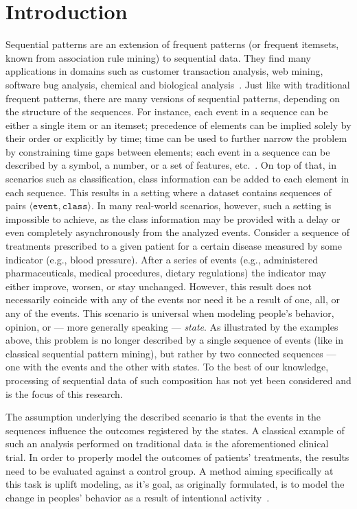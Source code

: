 \documentclass[runningheads,a4paper]{llncs}
\begin{document}
\section{Introduction}
\label{sec:introduction}

Sequential patterns are an extension of frequent patterns (or frequent itemsets, known from association rule mining) to sequential data.
They find many applications in domains such as customer transaction analysis, web mining, software bug analysis, chemical and biological analysis~\cite{Aggarwal:2014}.
Just like with traditional frequent patterns, there are many versions of sequential patterns, depending on the structure of the sequences.
For instance, each event in a sequence can be either a single item or an itemset; precedence of elements can be implied solely by their order or explicitly by time; time can be used to further narrow the problem by constraining time gaps between elements; each event in a sequence can be described by a symbol, a number, or a set of features, etc.~\cite{Dong:2009}.
On top of that, in scenarios such as classification, class information can be added to each element in each sequence.
This results in a setting where a dataset contains sequences of pairs $\langle\texttt{event}, \texttt{class}\rangle$.
In many real-world scenarios, however, such a setting is impossible to achieve, as the class information may be provided with a delay or even completely asynchronously from the analyzed events.
Consider a sequence of treatments prescribed to a given patient for a certain disease measured by some indicator (e.g., blood pressure).
After a series of events (e.g., administered pharmaceuticals, medical procedures, dietary regulations) the indicator may either improve, worsen, or stay unchanged.
However, this result does not necessarily coincide with any of the events nor need it be a result of one, all, or any of the events.
This scenario is universal when modeling people's behavior, opinion, or --- more generally speaking --- \textit{state}.
As illustrated by the examples above, this problem is no longer described by a single sequence of events (like in classical sequential pattern mining), but rather by two connected sequences --- one with the events and the other with states.
To the best of our knowledge, processing of sequential data of such composition has not yet been considered and is the focus of this research.

The assumption underlying the described scenario is that the events in the sequences influence the outcomes registered by the states.
A classical example of such an analysis performed on traditional data is the aforementioned clinical trial.
In order to properly model the outcomes of patients' treatments, the results need to be evaluated against a control group.
A method aiming specifically at this task is uplift modeling, as it's goal, as originally formulated, is to model the change in peoples' behavior as a result of intentional activity~\cite{Radcliffe:1999}.
\end{document}
